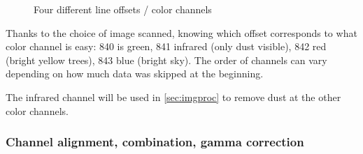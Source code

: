 \documentclass{article}
\begin{document}
\begin{figure}[H]
  \caption{Four different line offsets / color channels}
  \centering
   \quad
  
   \quad
\end{figure}

Thanks to the choice of image scanned, knowing which offset corresponds to what color channel
is easy: 840 is green, 841 infrared (only dust visible), 842 red (bright yellow trees), 843 blue (bright sky).
The order of channels can vary depending on how much data was skipped at the beginning.

The infrared channel will be used in \autoref{sec:imgproc} to remove dust at the other color channels.

\subsubsection{Channel alignment, combination, gamma correction}
\label{sssec:channelcombine}
\end{document}
